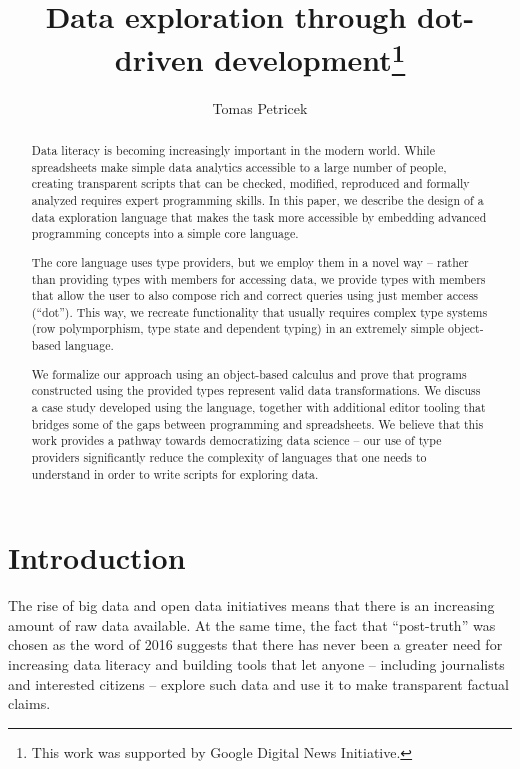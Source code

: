 \documentclass[a4paper,UKenglish]{lipics-v2016}
\title{Data exploration through dot-driven development\footnote{This 
  work was supported by Google Digital News Initiative.}}
\author[1]{Tomas Petricek}
\affil[1]{The Alan Turing Institute, London, UK\\
  \texttt{tomas@tomasp.net}}
\theoremstyle{plain}
\theoremstyle{definition}
\begin{document}
\maketitle

\begin{abstract}
Data literacy is becoming increasingly important in the modern world. While spreadsheets make 
simple data analytics accessible to a large number of people, creating transparent scripts that 
can be checked, modified, reproduced and formally analyzed requires expert programming skills. 
In this paper, we describe the design of a data exploration language that makes the task more 
accessible by embedding advanced programming concepts into a simple core language.

The core language uses type providers, but we employ them in a novel way -- rather than providing 
types with members for accessing data, we provide types with members that allow the user to also 
compose rich and correct queries using just member access (``dot''). This way, we recreate 
functionality that usually requires complex type systems (row polymporphism, type state and dependent 
typing) in an extremely simple object-based language.

We formalize our approach using an object-based calculus and prove that programs constructed using 
the provided types represent valid data transformations. We discuss a case study developed using the 
language, together with additional editor tooling that bridges some of the gaps between programming 
and spreadsheets. We believe that this work provides a pathway towards democratizing data science 
-- our use of type providers significantly reduce the complexity of languages that one needs to 
understand in order to write scripts for exploring data.
\end{abstract}


\section{Introduction}
\label{sec:intro}

The rise of big data and open data initiatives means that there is an increasing amount of raw data 
available. At the same time, the fact that ``post-truth'' was chosen as the word of 2016 \cite{posttruth} 
suggests that there has never been a greater need for increasing data literacy and building tools that let 
anyone -- including journalists and interested citizens -- explore such data and use it to make
transparent factual claims.
\end{document}
